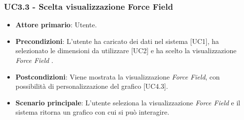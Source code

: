 \subsubsection{UC3.3 - Scelta visualizzazione Force Field}
\begin{itemize}
	\item \textbf{Attore primario}: Utente.
	\item \textbf{Precondizioni}: L'utente ha caricato dei dati nel sistema [UC1], ha selezionato le dimensioni da utilizzare [UC2] e ha scelto la visualizzazione \textit{Force Field} .
	\item \textbf{Postcondizioni}: Viene mostrata la visualizzazione \textit{Force Field}, con possibilità di personalizzazione del grafico [UC4.3].
	\item \textbf{Scenario principale}: L'utente seleziona la visualizzazione \textit{Force Field} e il sistema ritorna un grafico con cui si può interagire.
\end{itemize}